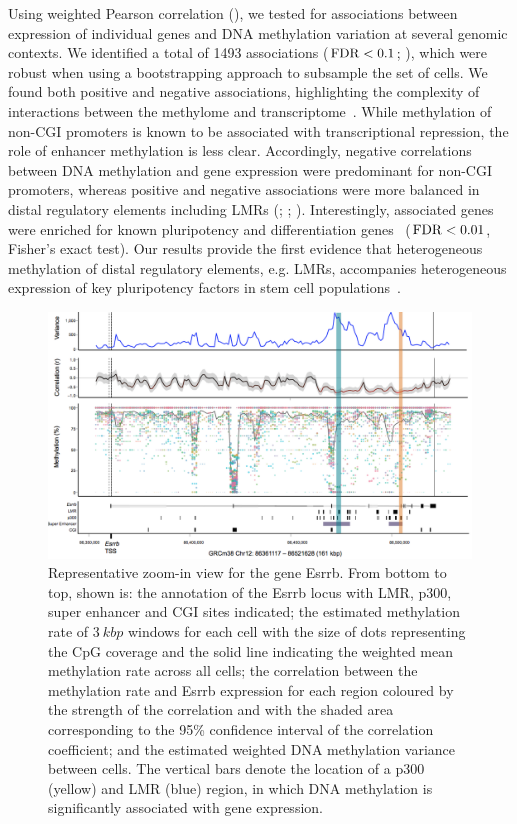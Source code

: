 Using weighted Pearson correlation (), we tested for associations between expression of individual genes and DNA methylation variation at several genomic contexts. We identified a total of 1493 associations ($\operatorname{FDR}<0.1$; ), which were robust when using a bootstrapping approach to subsample the set of cells. We found both positive and negative associations, highlighting the complexity of interactions between the methylome and transcriptome~\citep{dey_integrated_2015}. While methylation of non-CGI promoters is known to be associated with transcriptional repression, the role of enhancer methylation is less clear. Accordingly, negative correlations between DNA methylation and gene expression were predominant for non-CGI promoters, whereas positive and negative associations were more balanced in distal regulatory elements including LMRs (; ; ). Interestingly, associated genes were enriched for known pluripotency and differentiation genes~\citep{kolodziejczyk_single_2015} ($\operatorname{FDR}<0.01$, Fisher's exact test). Our results provide the first evidence that heterogeneous methylation of distal regulatory elements, e.g. LMRs, accompanies heterogeneous expression of key pluripotency factors in stem cell populations~\citep{lee_reprogramming_2014}.

\begin{figure}[htbp!]
\centering
\includegraphics[width=1.0\textwidth]{zoom}
\caption[Representative zoom-in view for the gene Esrrb.]{Representative zoom-in view for the gene Esrrb. From bottom to top, shown is: the annotation of the Esrrb locus with LMR, p300, super enhancer and CGI sites indicated; the estimated methylation rate of $3~kbp$ windows for each cell with the size of dots representing the CpG coverage and the solid line indicating the weighted mean methylation rate across all cells; the correlation between the methylation rate and Esrrb expression for each region coloured by the strength of the correlation and with the shaded area corresponding to the 95\% confidence interval of the correlation coefficient; and the estimated weighted DNA methylation variance between cells. The vertical bars denote the location of a p300 (yellow) and LMR (blue) region, in which DNA methylation is significantly associated with gene expression.}
\label{fig:mt_zoom}
\end{figure}


